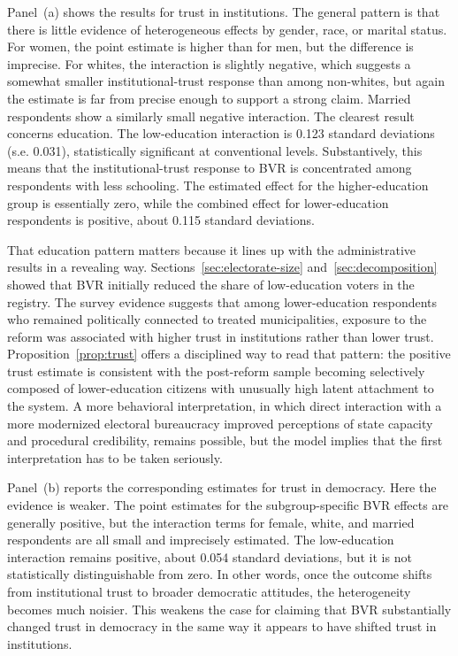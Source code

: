 Panel~(a) shows the results for trust in institutions. The general pattern is that there is little evidence of heterogeneous effects by gender, race, or marital status. For women, the point estimate is higher than for men, but the difference is imprecise. For whites, the interaction is slightly negative, which suggests a somewhat smaller institutional-trust response than among non-whites, but again the estimate is far from precise enough to support a strong claim. Married respondents show a similarly small negative interaction. The clearest result concerns education. The low-education interaction is 0.123 standard deviations (s.e. 0.031), statistically significant at conventional levels. Substantively, this means that the institutional-trust response to BVR is concentrated among respondents with less schooling. The estimated effect for the higher-education group is essentially zero, while the combined effect for lower-education respondents is positive, about 0.115 standard deviations.

That education pattern matters because it lines up with the administrative results in a revealing way. Sections~\ref{sec:electorate-size} and~\ref{sec:decomposition} showed that BVR initially reduced the share of low-education voters in the registry. The survey evidence suggests that among lower-education respondents who remained politically connected to treated municipalities, exposure to the reform was associated with higher trust in institutions rather than lower trust. Proposition~\ref{prop:trust} offers a disciplined way to read that pattern: the positive trust estimate is consistent with the post-reform sample becoming selectively composed of lower-education citizens with unusually high latent attachment to the system. A more behavioral interpretation, in which direct interaction with a more modernized electoral bureaucracy improved perceptions of state capacity and procedural credibility, remains possible, but the model implies that the first interpretation has to be taken seriously.

Panel~(b) reports the corresponding estimates for trust in democracy. Here the evidence is weaker. The point estimates for the subgroup-specific BVR effects are generally positive, but the interaction terms for female, white, and married respondents are all small and imprecisely estimated. The low-education interaction remains positive, about 0.054 standard deviations, but it is not statistically distinguishable from zero. In other words, once the outcome shifts from institutional trust to broader democratic attitudes, the heterogeneity becomes much noisier. This weakens the case for claiming that BVR substantially changed trust in democracy in the same way it appears to have shifted trust in institutions.

